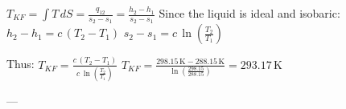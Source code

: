 \( T_{KF} = \int T \, dS = \frac{q_{12}}{s_2 - s_1} = \frac{h_2 - h_1}{s_2 - s_1} \)  
Since the liquid is ideal and isobaric:  
\( h_2 - h_1 = c \, (T_2 - T_1) \)  
\( s_2 - s_1 = c \, \ln \left( \frac{T_2}{T_1} \right) \)  

Thus:  
\( T_{KF} = \frac{c \, (T_2 - T_1)}{c \, \ln \left( \frac{T_2}{T_1} \right)} \)  
\( T_{KF} = \frac{298.15 \, \text{K} - 288.15 \, \text{K}}{\ln \left( \frac{298.15}{288.15} \right)} = 293.17 \, \text{K} \)  

---